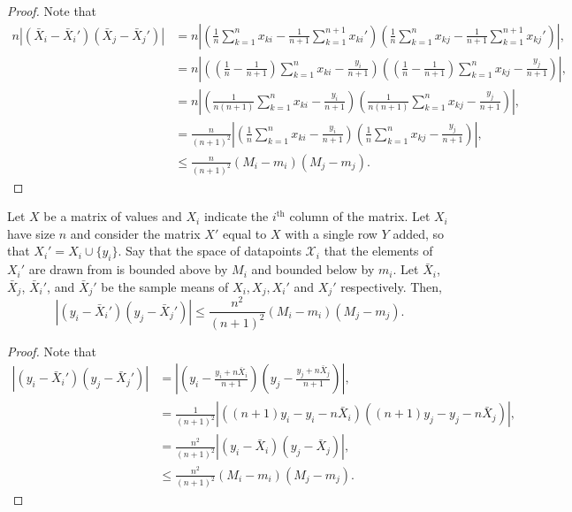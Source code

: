 \documentclass[11pt]{scrartcl} %
\begin{document}
\begin{proof}
Note that
\begin{align*}
 n \left\vert (\bar{X}_i - \bar{X}_i')(\bar{X}_j - \bar{X}_j') \right\vert &= n\left\vert \left( \frac{1}{n} \sum_{k=1}^n x_{ki} - \frac{1}{n+1} \sum_{k=1}^{n+1} x_{ki}' \right) \left( \frac{1}{n} \sum_{k=1}^n x_{kj} - \frac{1}{n+1} \sum_{k=1}^{n+1} x_{kj}' \right)\right\vert, \\
 	&= n \left\vert \left( \left(\frac{1}{n} - \frac{1}{n+1}\right) \sum_{k=1}^n x_{ki} - \frac{y_i}{n+1} \right)\left( \left(\frac{1}{n} - \frac{1}{n+1}\right) \sum_{k=1}^n x_{kj} - \frac{y_j}{n+1} \right) \right\vert, \\
	&= n  \left\vert \left(\frac{1}{n(n+1)} \sum_{k=1}^n x_{ki} - \frac{y_i}{n+1} \right)\left( \frac{1}{n(n+1)} \sum_{k=1}^n x_{kj} - \frac{y_j}{n+1} \right) \right\vert, \\
	&= \frac{n}{(n+1)^2} \left\vert \left( \frac{1}{n} \sum_{k=1}^n x_{ki} - \frac{y_i}{n+1} \right)\left( \frac{1}{n} \sum_{k=1}^n x_{kj} - \frac{y_j}{n+1} \right) \right\vert,\\
	&\le \frac{n}{(n+1)^2} (M_i - m_i)(M_j - m_j).
 \end{align*}
\end{proof}

\begin{lemma}
\label{lemma:term2bound}
Let $X$ be a matrix of values and $X_i$ indicate the $i^{\text{th}}$ column of the matrix. Let  $X_i$ have size $n$ and consider the matrix $X'$ equal to $X$ with a single row $Y$ added, so that $X_i' = X_i \cup \{y_i\}$. Say that the space of datapoints $\mathcal{X}_i$ that the elements of $X_i'$ are drawn from is bounded above by $M_i$ and bounded below by $m_i$. Let  $\bar{X}_i$, $\bar{X}_j$, $\bar{X}_i'$, and $\bar{X}_j'$ be the sample means of $X_i, X_j, X_i'$ and $X_j'$ respectively. Then,
$$ \left\vert (y_i - \bar{X}_i')(y_j - \bar{X}_j') \right\vert \le \frac{n^2}{(n+1)^2}(M_i - m_i)(M_j-m_j).$$
\end{lemma}

\begin{proof}
Note that
\begin{align*}
 \left\vert (y_i - \bar{X}_i')(y_j - \bar{X}_j') \right\vert &= \left\vert \left( y_i - \frac{y_i + n \bar{X}_i}{n+1}\right) \left( y_j - \frac{y_j + n \bar{X}_j}{n+1}\right) \right\vert, \\
 	&= \frac{1}{(n+1)^2} \left\vert \left((n+1)y_i - y_i - n\bar{X}_i \right)\left((n+1)y_j - y_j - n\bar{X}_j \right) \right\vert, \\
	&= \frac{n^2}{(n+1)^2} \left\vert (y_i - \bar{X}_i)(y_j - \bar{X}_j)\right\vert, \\
	&\le \frac{n^2}{(n+1)^2} (M_i - m_i)(M_j - m_j).
\end{align*}
\end{proof}
\end{document}
